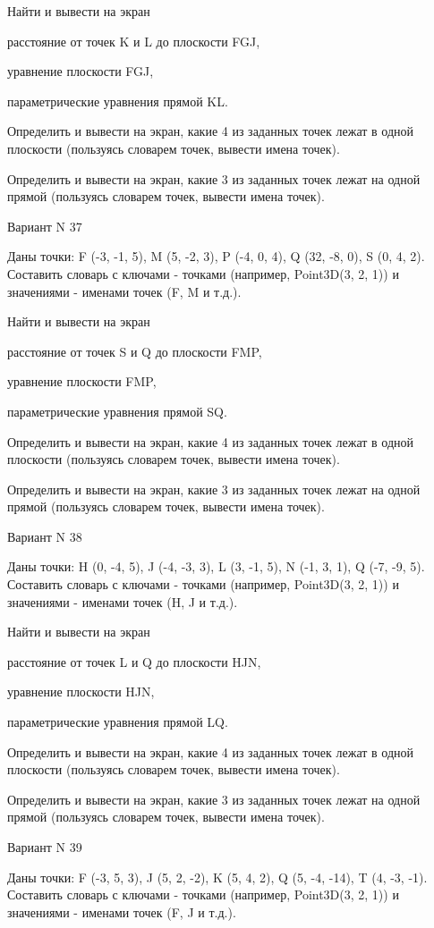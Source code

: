 \documentclass[11pt]{report}
\begin{document}
Найти и вывести на экран


расстояние от точек K и L до плоскости FGJ,


уравнение плоскости FGJ,


параметрические уравнения прямой KL.


Определить и вывести на экран, какие 4 из заданных точек лежат в одной плоскости (пользуясь словарем точек, вывести имена точек).


Определить и вывести на экран, какие 3 из заданных точек лежат на одной прямой (пользуясь словарем точек, вывести имена точек).

\newpage
Вариант N 37

Даны точки: F (-3, -1, 5), M (5, -2, 3), P (-4, 0, 4), Q (32, -8, 0), S (0, 4, 2).
Составить словарь с ключами - точками (например, Point3D(3, 2, 1)) и значениями - именами точек (F, M и т.д.).


Найти и вывести на экран


расстояние от точек S и Q до плоскости FMP,


уравнение плоскости FMP,


параметрические уравнения прямой SQ.


Определить и вывести на экран, какие 4 из заданных точек лежат в одной плоскости (пользуясь словарем точек, вывести имена точек).


Определить и вывести на экран, какие 3 из заданных точек лежат на одной прямой (пользуясь словарем точек, вывести имена точек).

\newpage
Вариант N 38

Даны точки: H (0, -4, 5), J (-4, -3, 3), L (3, -1, 5), N (-1, 3, 1), Q (-7, -9, 5).
Составить словарь с ключами - точками (например, Point3D(3, 2, 1)) и значениями - именами точек (H, J и т.д.).


Найти и вывести на экран


расстояние от точек L и Q до плоскости HJN,


уравнение плоскости HJN,


параметрические уравнения прямой LQ.


Определить и вывести на экран, какие 4 из заданных точек лежат в одной плоскости (пользуясь словарем точек, вывести имена точек).


Определить и вывести на экран, какие 3 из заданных точек лежат на одной прямой (пользуясь словарем точек, вывести имена точек).

\newpage
Вариант N 39

Даны точки: F (-3, 5, 3), J (5, 2, -2), K (5, 4, 2), Q (5, -4, -14), T (4, -3, -1).
Составить словарь с ключами - точками (например, Point3D(3, 2, 1)) и значениями - именами точек (F, J и т.д.).
\end{document}
